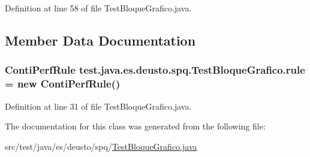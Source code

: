 Definition at line 58 of file Test\+Bloque\+Grafico.\+java.



\subsection{Member Data Documentation}
\subsubsection[{\texorpdfstring{rule}{rule}}]{\setlength{\rightskip}{0pt plus 5cm}Conti\+Perf\+Rule test.\+java.\+es.\+deusto.\+spq.\+Test\+Bloque\+Grafico.\+rule = new Conti\+Perf\+Rule()}\hypertarget{classtest_1_1java_1_1es_1_1deusto_1_1spq_1_1_test_bloque_grafico_aa38de09c9a4a9ac5445c4b6cc66c6aa6}{}\label{classtest_1_1java_1_1es_1_1deusto_1_1spq_1_1_test_bloque_grafico_aa38de09c9a4a9ac5445c4b6cc66c6aa6}


Definition at line 31 of file Test\+Bloque\+Grafico.\+java.



The documentation for this class was generated from the following file\+:\begin{DoxyCompactItemize}
\item 
src/test/java/es/deusto/spq/\hyperlink{_test_bloque_grafico_8java}{Test\+Bloque\+Grafico.\+java}\end{DoxyCompactItemize}

